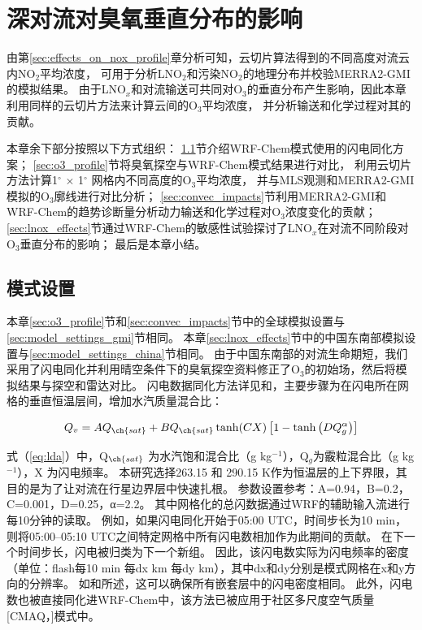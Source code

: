 
\chapter{深对流对臭氧垂直分布的影响}

由第\ref{sec:effects_on_nox_profile}章分析可知，云切片算法得到的不同高度对流云内NO$_2$平均浓度，
可用于分析LNO$_2$和污染NO$_2$的地理分布并校验MERRA2-GMI的模拟结果。
由于LNO$_x$和对流输送可共同对O$_3$的垂直分布产生影响，因此本章利用同样的云切片方法来计算云间的O$_3$平均浓度，
并分析输送和化学过程对其的贡献。

本章余下部分按照以下方式组织：
\ref{sec:model_settings_assimilation}节介绍WRF-Chem模式使用的闪电同化方案；
\ref{sec:o3_profile}节将臭氧探空与WRF-Chem模式结果进行对比，
利用云切片方法计算1$^{\circ}$ $\times$ 1$^{\circ}$ 网格内不同高度的O$_3$平均浓度，
并与MLS观测和MERRA2-GMI模拟的O$_3$廓线进行对比分析；
\ref{sec:convec_impacts}节利用MERRA2-GMI和WRF-Chem的趋势诊断量分析动力输送和化学过程对O$_3$浓度变化的贡献；
\ref{sec:lnox_effects}节通过WRF-Chem的敏感性试验探讨了LNO$_x$在对流不同阶段对O$_3$垂直分布的影响；
最后是本章小结。


\section{模式设置} \label{sec:model_settings_assimilation}

本章\ref{sec:o3_profile}节和\ref{sec:convec_impacts}节中的全球模拟设置与\ref{sec:model_settings_gmi}节相同。
本章\ref{sec:lnox_effects}节中的中国东南部模拟设置与\ref{sec:model_settings_china}节相同。
由于中国东南部的对流生命期短，我们采用了闪电同化并利用晴空条件下的臭氧探空资料修正了O$_3$的初始场，然后将模拟结果与探空和雷达对比。
闪电数据同化方法详见\citet{Fierro.2012}和\citet{Li.2017b}，主要步骤为在闪电所在网格的垂直恒温层间，增加水汽质量混合比：

\begin{equation} \label{eq:lda}
Q_{v}=A Q_{\ch{sat}}+B Q_{\ch{sat}} \tanh (C X)\left[1-\tanh \left(D Q_{g}^{\alpha}\right)\right]
\end{equation}

式（\ref{eq:lda}）中，Q$_{\ch{sat}}$ 为水汽饱和混合比（g kg$^{−1}$），Q$_g$为霰粒混合比（g kg$^{−1}$），X 为闪电频率。
本研究选择263.15 和 290.15 K作为恒温层的上下界限，其目的是为了让对流在行星边界层中快速扎根\citep{Marchand.2014,Finney.2016,Li.2017b}。
参数设置参考\citet{Li.2017b}：A=0.94，B=0.2，C=0.001，D=0.25，α=2.2。
其中网格化的总闪数据通过WRF的辅助输入流进行每10分钟的读取。
例如，如果闪电同化开始于05:00 UTC，时间步长为10 min，则将05:00--05:10 UTC之间特定网格中所有闪电数相加作为此期间的贡献。
在下一个时间步长，闪电被归类为下一个新组。
因此，该闪电数实际为闪电频率的密度（单位：flash每10 min 每dx km 每dy km），其中dx和dy分别是模式网格在x和y方向的分辨率。
如\citet{Fierro.2012}和\citet{Li.2017b}所述，这可以确保所有嵌套层中的闪电密度相同。
此外，闪电数也被直接同化进WRF-Chem中，该方法已被应用于社区多尺度空气质量[CMAQ，\citet{Kang.2019a,Kang.2019,Kang.2020}]模式中。


